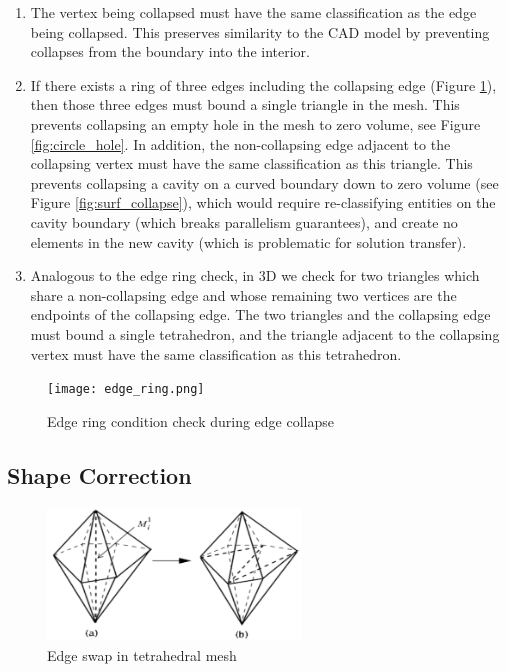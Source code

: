 \begin{enumerate}
\item The vertex being collapsed must have the same classification as
the edge being collapsed. This preserves similarity to the CAD model by
preventing collapses from the boundary into the interior.
\item If there exists a ring of three edges including the collapsing edge
(Figure \ref{fig:edge_ring}),
then those three edges must bound a single triangle in the mesh.
This prevents collapsing an empty hole in the mesh to zero volume,
see Figure \ref{fig:circle_hole}.
In addition, the non-collapsing edge adjacent to the collapsing vertex must have the same
classification as this triangle.
This prevents collapsing a cavity on a curved boundary down to zero volume
(see Figure \ref{fig:surf_collapse}), which would require re-classifying
entities on the cavity boundary (which breaks parallelism guarantees), and
create no elements in the new cavity (which is problematic for solution transfer).
\item Analogous to the edge ring check, in 3D we check for two triangles which
share a non-collapsing edge and whose remaining two vertices are the endpoints
of the collapsing edge.
The two triangles and the collapsing edge must bound a single tetrahedron,
and the triangle adjacent to the collapsing vertex must have the same classification
as this tetrahedron.
\end{enumerate}

\begin{figure}
\begin{center}
\texttt{[image: edge\_ring.png]}
\caption{Edge ring condition check during edge collapse}
\label{fig:edge_ring}
\end{center}
\end{figure}

\subsection{Shape Correction}

\begin{figure}
\begin{center}
\includegraphics[width=0.6\textwidth]{swap.png}
\caption{Edge swap in tetrahedral mesh
\cite{lu2011developments}}
\label{fig:swap}
\end{center}
\end{figure}

